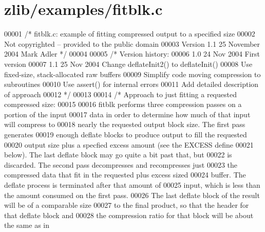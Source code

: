 \hypertarget{zlib_2examples_2fitblk_8c_source}{}\section{zlib/examples/fitblk.c}
\label{zlib_2examples_2fitblk_8c_source}

\begin{DoxyCode}
00001 \textcolor{comment}{/* fitblk.c: example of fitting compressed output to a specified size}
00002 \textcolor{comment}{   Not copyrighted -- provided to the public domain}
00003 \textcolor{comment}{   Version 1.1  25 November 2004  Mark Adler */}
00004 
00005 \textcolor{comment}{/* Version history:}
00006 \textcolor{comment}{   1.0  24 Nov 2004  First version}
00007 \textcolor{comment}{   1.1  25 Nov 2004  Change deflateInit2() to deflateInit()}
00008 \textcolor{comment}{                     Use fixed-size, stack-allocated raw buffers}
00009 \textcolor{comment}{                     Simplify code moving compression to subroutines}
00010 \textcolor{comment}{                     Use assert() for internal errors}
00011 \textcolor{comment}{                     Add detailed description of approach}
00012 \textcolor{comment}{ */}
00013 
00014 \textcolor{comment}{/* Approach to just fitting a requested compressed size:}
00015 \textcolor{comment}{}
00016 \textcolor{comment}{   fitblk performs three compression passes on a portion of the input}
00017 \textcolor{comment}{   data in order to determine how much of that input will compress to}
00018 \textcolor{comment}{   nearly the requested output block size.  The first pass generates}
00019 \textcolor{comment}{   enough deflate blocks to produce output to fill the requested}
00020 \textcolor{comment}{   output size plus a specfied excess amount (see the EXCESS define}
00021 \textcolor{comment}{   below).  The last deflate block may go quite a bit past that, but}
00022 \textcolor{comment}{   is discarded.  The second pass decompresses and recompresses just}
00023 \textcolor{comment}{   the compressed data that fit in the requested plus excess sized}
00024 \textcolor{comment}{   buffer.  The deflate process is terminated after that amount of}
00025 \textcolor{comment}{   input, which is less than the amount consumed on the first pass.}
00026 \textcolor{comment}{   The last deflate block of the result will be of a comparable size}
00027 \textcolor{comment}{   to the final product, so that the header for that deflate block and}
00028 \textcolor{comment}{   the compression ratio for that block will be about the same as in}

\end{DoxyCode}
